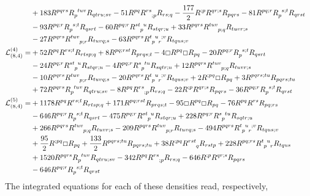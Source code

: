 \documentclass[11pt]{article}
\begin{document}
{\begin{align}
\nonumber\\
&+ 183 R^{pqrs} \tensor{R}{_p^{tuv}} R_{qtru;sv} - 51 R^{pq} \tensor{R}{^{rs}_{;p}} R_{rs;q} - \frac{177}{2} R^{;p} R^{qr;s} R_{pqrs} - 81 R^{pq;r} \tensor{R}{_p^{s;t}} R_{qrst} 
\nonumber\\
&- 93 R^{pq;r} \tensor{R}{_p^{s;t}} R_{qsrt} - 60 R^{pq;r} \tensor{R}{^{st}_p^u} R_{stqr;u} + 33 R^{pqrs} \tensor{R}{^{tuv}_{p;q}} R_{tuvr;s} \nonumber\\
& - 27 R^{pqrs} \tensor{R}{^{tuv}_{p;r}} R_{tuvq;s} 
- 63 R^{pqrs} \tensor{R}{^t_p^u_r^{;v}} R_{tqus;v}
\\
\mathcal{L}_{(8,4)}^{(4)} =&+ 52 R^{p q} R^{rs;t} R_{rtsp;q} + 8 R^{pq;rst} R_{prqs;t}  -4 \Box R^{pq} \Box R_{pq} -20 R^{pq;r} \tensor{R}{_p^{s;t}} R_{qsrt} \nonumber\\
&- 24 R^{pq;r} \tensor{R}{^{st}_p^u} R_{stqr;u} 
-4 R^{pq;r} \tensor{R}{^s_p^{tu}} R_{sqtr;u} + 12 R^{pqrs}\tensor{R}{^{tuv}_{p;q}} R_{tuvr;s} \nonumber\\
& - 10 R^{pqrs} \tensor{R}{^{tuv}_{p;r}} R_{tuvq;s} -20 R^{pqrs} \tensor{R}{^t_p^u_r^{;v}} R_{tqus;v} 
+ 2 R^{;pq} \Box R_{pq} + 3R^{pqrs;tu} R_{pqrs;tu} \nonumber\\
&+ 72 R^{pqrs} \tensor{R}{_p^{tuv}} R_{qtru;sv} - 8R^{pq} \tensor{R}{^{rs}_{;p}} R_{rs;q} -22 R^{;p} R^{qr;s} R_{pqrs} - 36 R^{pq;r} \tensor{R}{_p^{s;t}} R_{qrst}
\\
\mathcal{L}_{(8,4)}^{(5)} =&+ 1178 R^{pq} R^{rs;t} R_{rtsp;q} + 171 R^{pq;rst} R_{prqs;t} -95 \Box R^{pq} \Box R_{pq} -76 R^{pq} R^{rs} R_{pq;rs} \nonumber\\
&- 646 R^{pq;r} \tensor{R}{_p^{s;t}} R_{qsrt} 
-475 R^{pq;r} \tensor{R}{^{st}_p^u} R_{stqr;u} + 228 R^{pq;r} \tensor{R}{^s_p^{tu}} R_{sqtr;u} \nonumber\\
&+ 266 R^{pqrs} \tensor{R}{^{tuv}_{p;q}} R_{tuvr;s} - 209 R^{pqrs} \tensor{R}{^{tuv}_{p;r}} R_{tuvq;s} 
-494 R^{pqrs} \tensor{R}{^t_p^u_r^{;v}} R_{tqus;v} \nonumber\\
&+ \frac{95}{2} R^{;pq} \Box R_{pq} + \frac{133}{2} R^{pqrs;tu}R_{pqrs;tu} + 38 R^{;pq} \tensor{R}{^{rst}_q} R_{rstp} 
+ 228  R^{pq;rs} \tensor{R}{^t_p^u_r} R_{tqus}\nonumber\\
& + 1520 R^{pqrs} \tensor{R}{_p^{tuv}} R_{qtru;sv} - 342 R^{pq} \tensor{R}{^{rs}_{;p}} R_{rs;q} - 646  R^{;p} R^{qr;s} R_{pqrs}
 \nonumber\\
&- 646 R^{pq;r} \tensor{R}{_p^{s;t}} R_{qrst}
\end{align}
The integrated equations for each of these densities read, respectively,
}
\end{document}
